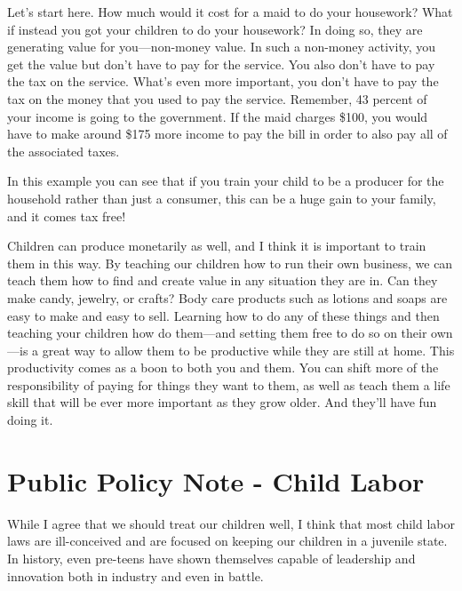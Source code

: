 \documentclass[letterpaper]{article}
\begin{document}
{\color{black}
\textcolor[rgb]{0.32941177,0.5529412,0.83137256}{Let’s start here. }How
much would it cost for a maid to do your housework?  What if
\textcolor[rgb]{0.32941177,0.5529412,0.83137256}{instead }you got your
children to do your housework?  In doing so, they are generating value
for you—non-money value. In such a non-money activity, you get the
value but don’t have to pay for the service. You also don’t have to pay
the tax on the service.
\textcolor[rgb]{0.32941177,0.5529412,0.83137256}{What’s e}ven more
important, you don’t have to pay the tax on the money that you used to
pay the service. Remember, 43 percent of your income is going to the
government. If the maid charges \$100, you would have to make around
\$175 more income to pay the bill in order to also pay all of the
associated taxes.}

{\color{black}
\textcolor[rgb]{0.32941177,0.5529412,0.83137256}{In this example y}ou
can see that if you train your child to be a producer for the household
rather than just a consumer, this can be a huge gain to your family,
and it comes tax free!}

{\color{black}
Children can produce monetarily as well, and I think it is important to
train them in this way. By teaching our children how to run their own
business, we can teach them how to find and create value in any
situation they are in. Can they make candy, jewelry, or crafts?  Body
care products such as lotions and soaps are easy to make and easy to
sell. \textcolor[rgb]{0.32941177,0.5529412,0.83137256}{Learning how to
do any of these things and then teaching your children how do them—and
setting them free to do so on their own—is a great way to allow them}
to be productive while they are still
\textcolor[rgb]{0.32941177,0.5529412,0.83137256}{at home}. This
productivity comes as a boon to both you and them. You can shift more
of the responsibility of paying for things they want to them, as well
as teach them a life skill that will be ever more important as they
grow older. \textcolor[rgb]{0.32941177,0.5529412,0.83137256}{And
they’ll have fun doing it.}}


\bigskip

\section{Public Policy Note - Child Labor}
{\color{black}
While I agree that we should treat our children well, I think that most
child labor laws are ill-conceived and are focused on keeping our
children in a juvenile state. In history, even pre-teens have shown
themselves capable of leadership and innovation both in industry and
even in battle. }
\end{document}
